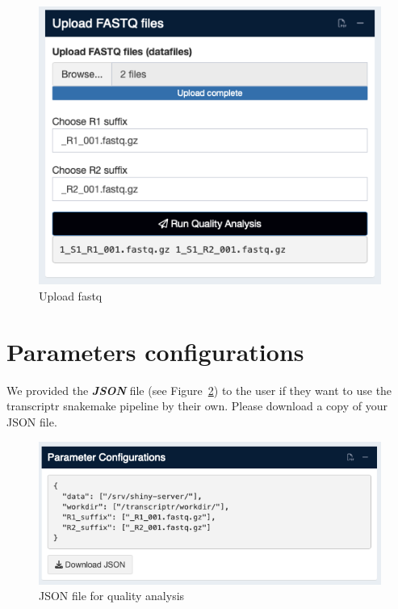 \documentclass[
  a4paper,
  oneside,
  open=any]{scrreport}
\begin{document}
\begin{figure}[H]

{\centering \includegraphics{./_images/quality/quality2.png}

}

\caption{\label{fig-qual2}Upload fastq}

\end{figure}

\hypertarget{parameters-configurations}{%
\section{Parameters configurations}\label{parameters-configurations}}

We provided the \textbf{\emph{JSON}} file (see Figure~\ref{fig-qual3})
to the user if they want to use the transcriptr snakemake pipeline by
their own. Please download a copy of your JSON file.

\begin{figure}[H]

{\centering \includegraphics{./_images/quality/quality3.png}

}

\caption{\label{fig-qual3}JSON file for quality analysis}

\end{figure}
\end{document}
